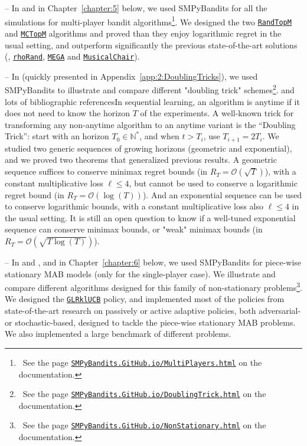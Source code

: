 -- In \cite{Besson2018ALT} and in Chapter~\ref{chapter:5} below, we used SMPyBandits for all the simulations for multi-player bandit algorithms\footnote{~See the page \texttt{\href{https://SMPyBandits.GitHub.io/MultiPlayers.html}{SMPyBandits.GitHub.io/MultiPlayers.html}} on the documentation.}. We designed the two \texttt{\href{https://SMPyBandits.GitHub.io/docs/PoliciesMultiPlayers.RandTopM.html}{RandTopM}} and \texttt{\href{https://SMPyBandits.GitHub.io/docs/PoliciesMultiPlayers.MCTopM.html}{MCTopM}} algorithms and proved than they enjoy logarithmic regret in the usual setting, and outperform significantly the previous state-of-the-art solutions (\ie, \texttt{\href{https://SMPyBandits.GitHub.io/docs/PoliciesMultiPlayers.rhoRand.html}{rhoRand}}, \texttt{\href{https://SMPyBandits.GitHub.io/docs/Policies.MEGA.html}{MEGA}} and \texttt{\href{https://SMPyBandits.GitHub.io/docs/Policies.MusicalChair.html}{MusicalChair}}).

-- In \cite{Besson2018DoublingTricks} (quickly presented in Appendix~\ref{app:2:DoublingTricks}), we used SMPyBandits to illustrate and compare different "doubling trick" schemes\footnote{~See the page \texttt{\href{https://SMPyBandits.GitHub.io/DoublingTrick.html}{SMPyBandits.GitHub.io/DoublingTrick.html}} on the documentation.}. and lots of bibliographic referencesIn sequential learning, an algorithm is anytime if it does not need to know the horizon $T$ of the experiments. A well-known trick for transforming any non-anytime algorithm to an anytime variant is the ``Doubling Trick'': start with an horizon $T_0\in\mathbb{N}^*$, and when $t > T_i$, use $T_{i+1} = 2 T_i$. We studied two generic sequences of growing horizons (geometric and exponential), and we proved two theorems that generalized previous results. A geometric sequence suffices to conserve minimax regret bounds (in $R_T = \mathcal{O}(\sqrt{T})$), with a constant multiplicative loss $\ell \leq 4$, but cannot be used to conserve a logarithmic regret bound (in $R_T = \mathcal{O}(\log(T))$). And an exponential sequence can be used to conserve logarithmic bounds, with a constant multiplicative loss also $\ell \leq 4$ in the usual setting. It is still an open question to know if a well-tuned exponential sequence can conserve minimax bounds, or "weak" minimax bounds (in $R_T = \mathcal{O}(\sqrt{T \log(T)})$).

-- In \cite{Besson2019GLRT} and \cite{Besson2019Gretsi}, and in Chapter~\ref{chapter:6} below, we used SMPyBandits for piece-wise stationary MAB models (only for the single-player case). We illustrate and compare different algorithms designed for this family of non-stationary problems\footnote{~See the page \texttt{\href{https://SMPyBandits.GitHub.io/NonStationary.html}{SMPyBandits.GitHub.io/NonStationary.html}} on the documentation.}.
We designed the \texttt{\href{https://SMPyBandits.GitHub.io/docs/Policies.GLR_UCB.html}{GLRklUCB}} policy, and implemented most of the policies from state-of-the-art research on passively or active adaptive policies, both adversarial- or stochastic-based, designed to tackle the piece-wise stationary MAB problems.
We also implemented a large benchmark of different problems.


